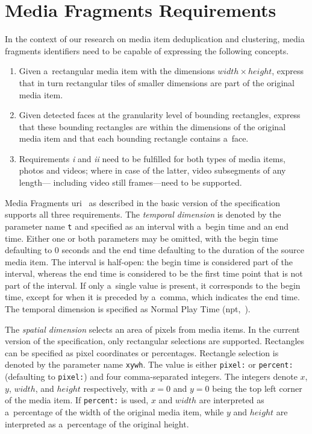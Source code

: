 \documentclass{article}
\begin{document}
\section{Media Fragments Requirements}
\label{sec:media-fragment-requirements}

In the context of our research on media item deduplication and clustering,
media fragments identifiers need to be capable of expressing the following concepts.

\begin{enumerate}[i]
  \itemsep0em 
  \item Given a~rectangular media item with the dimensions $ width \times height $,
    express that in turn rectangular tiles
    of smaller dimensions are part of the original media item.
  \item Given detected faces at the granularity level of bounding rectangles,
    express that these bounding rectangles are within the dimensions
    of the original media item and that each bounding rectangle contains a~face.
  \item Requirements \textit{i} and \textit{ii} need to be fulfilled for both
    types of media items, photos and videos;
    where in case of the latter, video subsegments of any length---%
    including video still frames---need to be supported.
\end{enumerate}

Media Fragments {\sc uri}~\cite{troncy2012mediafragments} as described in
the basic version of the specification supports all three requirements.
The \emph{temporal dimension} is denoted by the parameter name \texttt{t}
and specified as an interval with a~begin time and an end time.
Either one or both parameters may be omitted,
with the begin time defaulting to 0 seconds
and the end time defaulting to the duration of the source media item.
The interval is half-open: the begin time is considered part of the interval,
whereas the end time is considered to be the first time point
that is not part of the interval.
If only a~single value is present, it corresponds to the begin time,
except for when it is preceded by a~comma, which indicates the end time.
The temporal dimension is specified as Normal Play Time ({\sc npt},~\cite{schulzrinne1998realtime}).

The \emph{spatial dimension} selects an area of pixels from media items.
In the current version of the specification,
only rectangular selections are supported.
Rectangles can be specified as pixel coordinates or percentages.
Rectangle selection is denoted by the parameter name \texttt{xywh}.
The value is either \texttt{pixel:} or \texttt{percent:}
(defaulting to \texttt{pixel:}) and four comma-separated integers.
The integers denote $ x $, $ y $, $ width $, and $ height $ respectively,
with $ x = 0 $ and $ y = 0 $ being the top left corner of the media item.
If \texttt{percent:} is used,
$ x $ and $ width $ are interpreted as a~percentage
of the width of the original media item,
while $ y $ and $ height $ are interpreted as a~percentage
of the original height.
\end{document}
